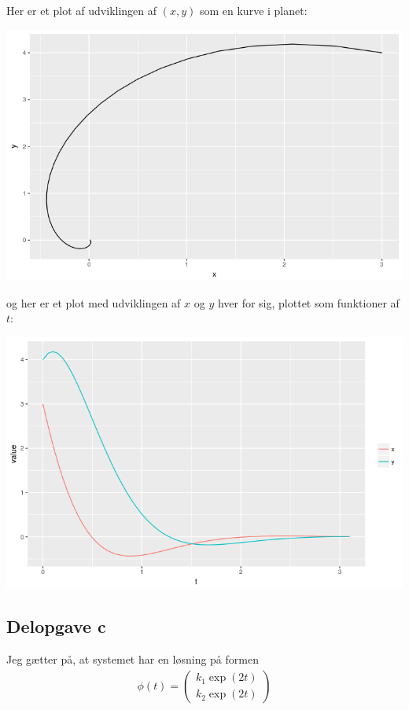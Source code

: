\documentclass[12pt]{article}
\begin{document}
Her er et plot af udviklingen af $(x,y)$ som en kurve i planet:
\begin{center}
\includegraphics[scale=0.5]{q2p2.png}
\end{center}
og her er et plot med udviklingen af $x$ og $y$ hver for sig, plottet som funktioner af $t$:
\begin{center}
\includegraphics[scale=0.5]{q2p3.png}
\end{center}

\subsection{Delopgave c}

Jeg gætter på, at systemet har en løsning på formen
\begin{align}
\phi(t) = \begin{pmatrix}
k_1 \exp(2t) \\ k_2 \exp(2t)
\end{pmatrix}
\end{align}
\end{document}
